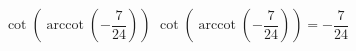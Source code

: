  {$\cot\left(\operatorname{arccot}\left(-\dfrac{7}{24}\right)\right)$}
{ $\cot\left(\operatorname{arccot}\left(-\dfrac{7}{24}\right)\right) = -\dfrac{7}{24}$}
